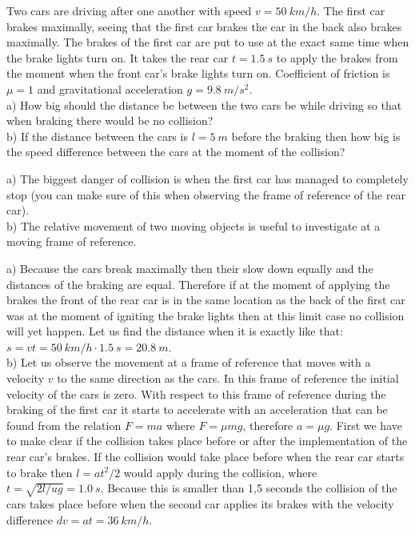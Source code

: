 {\ifEngStatement
Two cars are driving after one another with speed $v=\SI{50}{km/h}$. The first car brakes maximally, seeing that the first car brakes the car in the back also brakes maximally. The brakes of the first car are put to use at the exact same time when the brake lights turn on. It takes the rear car $t=\SI{1,5}{s}$ to apply the brakes from the moment when the front car’s brake lights turn on. Coefficient of friction is $\mu=1$ and gravitational acceleration $g=\SI{9,8}{m/s^2}$.\\
a) How big should the distance be between the two cars be while driving so that when braking there would be no collision?\\
b) If the distance between the cars is $l=\SI{5}{m}$ before the braking then how big is the speed difference between the cars at the moment of the collision?
\fi


\ifEngHint
a) The biggest danger of collision is when the first car has managed to completely stop (you can make sure of this when observing the frame of reference of the rear car).\\
b) The relative movement of two moving objects is useful to investigate at a moving frame of reference.
\fi


\ifEngSolution
a) Because the cars break maximally then their slow down equally and the distances of the braking are equal. Therefore if at the moment of applying the brakes the front of the rear car is in the same location as the back of the first car was at the moment of igniting the brake lights then at this limit case no collision will yet happen. Let us find the distance when it is exactly like that: $s=vt=\SI{50}{km/h}\cdot\SI{1,5}{s}=\SI{20,8}{m}$.\\
b) Let us observe the movement at a frame of reference that moves with a velocity $v$ to the same direction as the cars. In this frame of reference the initial velocity of the cars is zero. With respect to this frame of reference during the braking of the first car it starts to accelerate with an acceleration that can be found from the relation $F=ma$ where $F=\mu mg$, therefore $a=\mu g$. First we have to make clear if the collision takes place before or after the implementation of the rear car’s brakes. If the collision would take place before when the rear car starts to brake then $l=at^2/2$ would apply during the collision, where $t=\sqrt{2l/ug}=\SI{1.0}{s}$. Because this is smaller than 1,5 seconds the collision of the cars takes place before when the second car applies its brakes with the velocity difference $dv=at=\SI{36}{km/h}$.
\fi
}